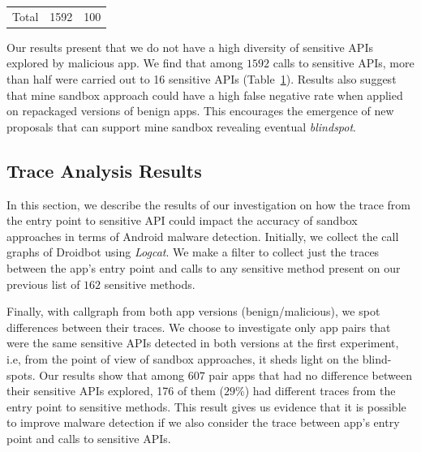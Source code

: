 \begin{table}[t]
\begin{small}
\begin{tabular}{lcc}
 \bottomrule
                            Total & 1592 & 100 \\

 \end{tabular}
 \end{small}
 \label{tab:APIused}
\end{table}

\begin{obs}{1}{}
   Our results present that we do not have a high diversity of sensitive APIs explored by malicious app. We find that among $1592$ calls to sensitive APIs, more than half were carried out to 16 sensitive APIs (Table~\ref{tab:APIused}). Results also suggest that mine sandbox approach could have a high false negative rate when applied on repackaged versions of benign apps. This encourages the emergence of new proposals that can support mine sandbox revealing eventual \textit{blindspot}.
 \end{obs}



\subsection{Trace Analysis Results}\label{sec:traceResults}

In this section, we describe the results of our investigation on how the trace from the entry point to sensitive API could impact the accuracy of sandbox approaches in terms of Android malware detection. Initially, we collect the call graphs of Droidbot using \emph{Logcat}. We make a filter to collect just the traces between the app's entry point and calls to any sensitive method present on our previous list of $162$ sensitive methods.

Finally, with callgraph from both app versions (benign/malicious), we spot differences between their traces. We choose to investigate only app pairs that were the same sensitive APIs detected in both versions at the first experiment, i.e, from the point of view of sandbox approaches, it sheds light on the blind-spots. Our results show that among $607$ pair apps that had no difference between their sensitive APIs explored, 176 of them ($29$\%) had different traces from the entry point to sensitive methods. This result gives us evidence that it is possible to improve malware detection if we also consider the trace between app's entry point and calls to sensitive APIs.

